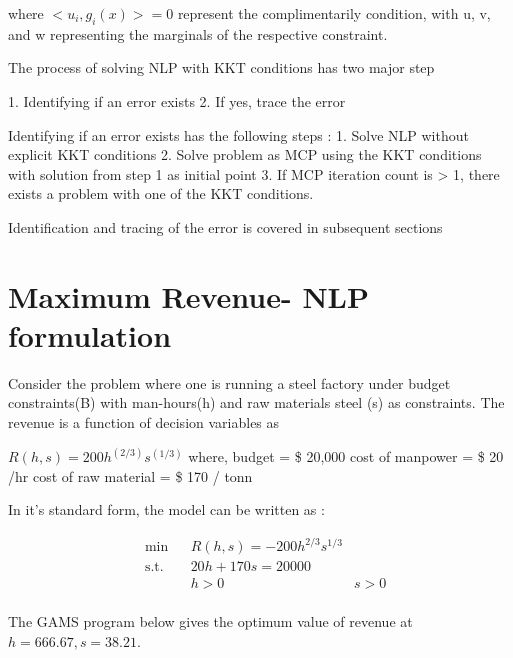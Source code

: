 \documentclass{article}
\begin{document}
where $<u_{i},g_{i}(x)> = 0$  represent the complimentarily condition, with u, v, and w representing the marginals of the respective constraint.

The process of solving NLP with KKT conditions has two major step

1. Identifying if an error exists
2. If yes, trace the error

Identifying if an error exists has the following steps :
1. Solve NLP without explicit KKT conditions
2. Solve problem as MCP using the KKT conditions with solution from step 1 as initial point
3. If MCP iteration count is > 1, there exists a problem with one of the KKT conditions.

Identification and tracing of the error is covered in subsequent sections



\section{Maximum Revenue- NLP formulation}

Consider the problem where one is running a steel factory under budget constraints(B) with man-hours(h) and raw materials steel (s) as constraints. The revenue is a function of decision variables as

$R(h,s) = 200 h^(2/3)s^(1/3) $
where, budget = \$ 20,000
cost of manpower = \$ 20 /hr
cost of raw material = \$ 170 / tonn

In it's standard form, the model can be written as :

\begin{equation}
\begin{aligned}
&	\min
& & R(h,s) = - 200 h^{2/3}s^{1/3}  \\
& \text{s.t.} & & 	 20h + 170s = 20000 \\
& & &			h > 0	 &	s > 0 \\
\end{aligned}
\end{equation}

The GAMS program below gives the optimum value of revenue at $h = 666.67 , s = 38.21$.
\end{document}
